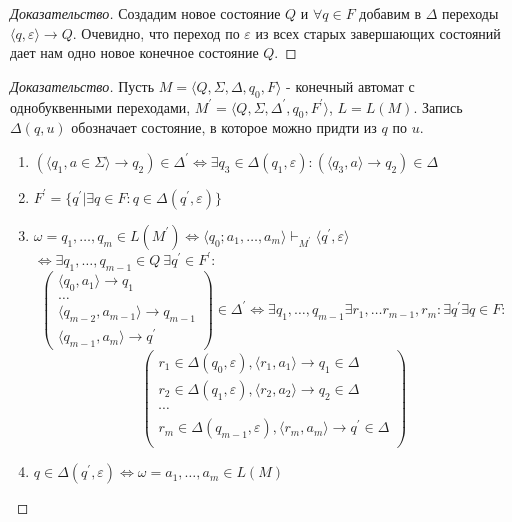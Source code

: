 \documentclass[11pt,a4paper]{article}
\theoremstyle{definition}
\theoremstyle{definition}
\theoremstyle{definition}
\begin{document}
\begin{proof}[Доказательство]
Создадим новое состояние $Q$ и $\forall q \in F $ добавим в $\Delta$ переходы $\langle q, \varepsilon \rangle\rightarrow Q$. Очевидно, что переход по $\varepsilon$ из всех старых завершающих состояний дает нам одно новое конечное состояние $Q$.
\end{proof}
\begin{proof}[Доказательство]
Пусть $M = \langle Q, \Sigma, \Delta, q_0, F\rangle$ - конечный автомат с однобуквенными переходами, $M^\prime = \langle Q, \Sigma, \Delta^\prime, q_0, F^\prime\rangle$,
$L = L(M)$. Запись $\Delta(q, u)$ обозначает состояние, в которое можно придти из $q$ по $u$.
\begin{enumerate}
\item{$
(\langle q_1, a \in \Sigma\rangle\rightarrow q_2) \in \Delta^\prime \Leftrightarrow\exists q_3 \in \Delta(q_1, \varepsilon) : (\langle q_3, a\rangle \rightarrow q_2) \in \Delta
$}
\item{$
F^\prime = \{q^\prime | \exists q \in F: q\in \Delta(q^\prime, \varepsilon)\}
$}
\item{$
\omega = q_1,\ldots, q_m \in L(M^\prime)\Leftrightarrow \langle q_0;a_1, \ldots, a_m\rangle\vdash_{M^\prime}\langle q^\prime, \varepsilon\rangle$
$
\Leftrightarrow \exists q_1,\ldots, q_{m-1}\in Q~ \exists q^\prime\in F^\prime: $
\[
\begin{pmatrix} 
\langle q_0, a_1\rangle\rightarrow q_1\\
\ldots\\
\langle q_{m-2}, a_{m-1}\rangle\rightarrow q_{m-1}\\
\langle q_{m-1}, a_m\rangle\rightarrow q^\prime
\end{pmatrix}\in \Delta^\prime \Leftrightarrow
\exists q_1, \ldots, q_{m-1} \exists r_1, \ldots r_{m-1}, r_m:
\exists q^\prime \exists q\in F:
\]
\[
\begin{pmatrix}
r_1\in \Delta(q_0, \varepsilon), \langle r_1, a_1\rangle\rightarrow q_1\in\Delta\\
r_2\in \Delta(q_1, \varepsilon), \langle r_2, a_2\rangle\rightarrow q_2\in\Delta\\
\cdots\\
r_m\in \Delta(q_{m-1}, \varepsilon), \langle r_m, a_m\rangle\rightarrow q^\prime\in\Delta\\
\end{pmatrix}
\]}
\item{$q\in\Delta(q^\prime, \varepsilon)\Leftrightarrow \omega=a_1,\ldots, a_m\in L(M)$}
\end{enumerate}
\end{proof}
\end{document}
